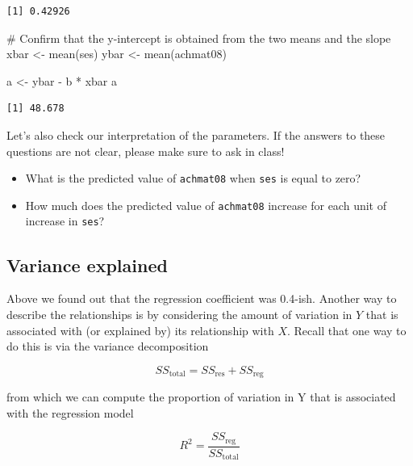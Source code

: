 \documentclass[
  letterpaper,
  DIV=11,
  numbers=noendperiod]{scrreprt}
\newenvironment{Shaded}{\begin{snugshade}}{\end{snugshade}}
\newcommand{\CommentTok}[1]{\textcolor[rgb]{0.37,0.37,0.37}{#1}}
\newcommand{\FunctionTok}[1]{\textcolor[rgb]{0.28,0.35,0.67}{#1}}
\newcommand{\NormalTok}[1]{\textcolor[rgb]{0.00,0.23,0.31}{#1}}
\newcommand{\OtherTok}[1]{\textcolor[rgb]{0.00,0.23,0.31}{#1}}
\newcommand{\SpecialCharTok}[1]{\textcolor[rgb]{0.37,0.37,0.37}{#1}}
\begin{document}
\begin{verbatim}
[1] 0.42926
\end{verbatim}

\begin{Shaded}
\begin{Highlighting}[]
\CommentTok{\# Confirm that the y{-}intercept is obtained from the two means and the slope}
\NormalTok{xbar }\OtherTok{\textless{}{-}} \FunctionTok{mean}\NormalTok{(ses)}
\NormalTok{ybar }\OtherTok{\textless{}{-}} \FunctionTok{mean}\NormalTok{(achmat08)}

\NormalTok{a }\OtherTok{\textless{}{-}}\NormalTok{ ybar }\SpecialCharTok{{-}}\NormalTok{ b }\SpecialCharTok{*}\NormalTok{ xbar}
\NormalTok{a}
\end{Highlighting}
\end{Shaded}

\begin{verbatim}
[1] 48.678
\end{verbatim}

Let's also check our interpretation of the parameters. If the answers to
these questions are not clear, please make sure to ask in class!

\begin{itemize}
\item
  What is the predicted value of \texttt{achmat08} when \texttt{ses} is
  equal to zero?
\item
  How much does the predicted value of \texttt{achmat08} increase for
  each unit of increase in \texttt{ses}?
\end{itemize}

\hypertarget{variance-explained}{%
\subsection{Variance explained}\label{variance-explained}}

Above we found out that the regression coefficient was 0.4-ish. Another
way to describe the relationships is by considering the amount of
variation in \(Y\) that is associated with (or explained by) its
relationship with \(X\). Recall that one way to do this is via the
variance decomposition

\[ SS_{\text{total}} = SS_{\text{res}} + SS_{\text{reg}}\]

from which we can compute the proportion of variation in Y that is
associated with the regression model

\[R^2 = \frac{SS_{\text{reg}}}{SS_{\text{total}}}\]
\end{document}
